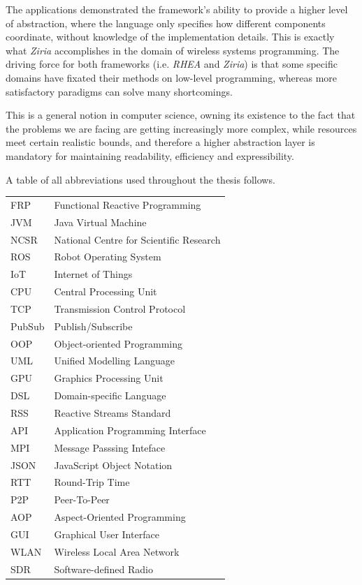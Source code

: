\documentclass{dithesis}
\begin{document}

The applications demonstrated the framework's ability to provide a higher level of abstraction, where the language only specifies how different components coordinate, without knowledge of the implementation details. This is exactly what \textit{Ziria} accomplishes in the domain of wireless systems programming\cite{ziria}. The driving force for both frameworks (i.e. \textit{RHEA} and \textit{Ziria}) is that some specific domains have fixated their methods on low-level programming, whereas more satisfactory paradigms can solve many shortcomings.

This is a general notion in computer science, owning its existence to the fact that the problems we are facing are getting increasingly more complex, while resources meet certain realistic bounds, and therefore a higher abstraction layer is mandatory for maintaining readability, efficiency and expressibility.

\begin{thesisabbreviations}
A table of all abbreviations used throughout the thesis follows.

\begin{tabularx}{\textwidth}{|X|X|}
  \hline
  FRP & Functional Reactive Programming \\
  JVM & Java Virtual Machine \\
  NCSR & National Centre for Scientific Research \\
  ROS & Robot Operating System \\
  IoT & Internet of Things \\
  CPU & Central Processing Unit \\
  TCP & Transmission Control Protocol \\
  PubSub & Publish/Subscribe \\
  OOP & Object-oriented Programming \\
  UML & Unified Modelling Language \\
  GPU & Graphics Processing Unit \\
  DSL & Domain-specific Language \\
  RSS & Reactive Streams Standard \\
  API & Application Programming Interface \\
  MPI & Message Passsing Inteface \\
  JSON & JavaScript Object Notation \\
  RTT & Round-Trip Time \\ 
  P2P & Peer-To-Peer \\
  AOP & Aspect-Oriented Programming \\
  GUI & Graphical User Interface \\
  WLAN & Wireless Local Area Network \\
  SDR & Software-defined Radio \\
  \hline
\end{tabularx}

\end{thesisabbreviations}
\end{document}
